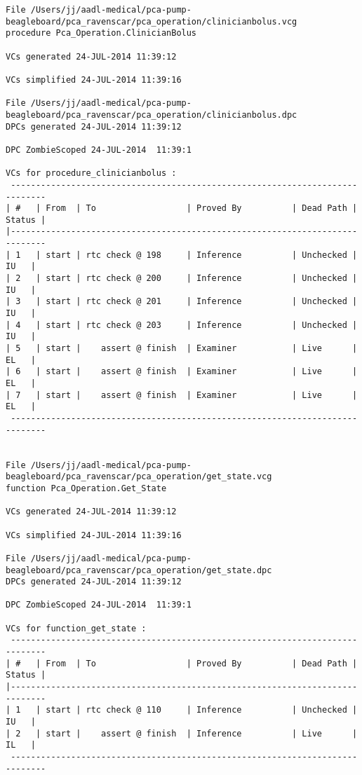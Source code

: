 \begin{lstlisting}[frame=single, gobble=0, caption={POGS report for PCA Pump prototype}]
File /Users/jj/aadl-medical/pca-pump-beagleboard/pca_ravenscar/pca_operation/clinicianbolus.vcg
procedure Pca_Operation.ClinicianBolus

VCs generated 24-JUL-2014 11:39:12

VCs simplified 24-JUL-2014 11:39:16

File /Users/jj/aadl-medical/pca-pump-beagleboard/pca_ravenscar/pca_operation/clinicianbolus.dpc
DPCs generated 24-JUL-2014 11:39:12

DPC ZombieScoped 24-JUL-2014  11:39:1

VCs for procedure_clinicianbolus :
 -----------------------------------------------------------------------------
| #   | From  | To                  | Proved By          | Dead Path | Status |
|-----------------------------------------------------------------------------
| 1   | start | rtc check @ 198     | Inference          | Unchecked |   IU   |
| 2   | start | rtc check @ 200     | Inference          | Unchecked |   IU   |
| 3   | start | rtc check @ 201     | Inference          | Unchecked |   IU   |
| 4   | start | rtc check @ 203     | Inference          | Unchecked |   IU   |
| 5   | start |    assert @ finish  | Examiner           | Live      |   EL   |
| 6   | start |    assert @ finish  | Examiner           | Live      |   EL   |
| 7   | start |    assert @ finish  | Examiner           | Live      |   EL   |
 -----------------------------------------------------------------------------


File /Users/jj/aadl-medical/pca-pump-beagleboard/pca_ravenscar/pca_operation/get_state.vcg
function Pca_Operation.Get_State

VCs generated 24-JUL-2014 11:39:12

VCs simplified 24-JUL-2014 11:39:16

File /Users/jj/aadl-medical/pca-pump-beagleboard/pca_ravenscar/pca_operation/get_state.dpc
DPCs generated 24-JUL-2014 11:39:12

DPC ZombieScoped 24-JUL-2014  11:39:1

VCs for function_get_state :
 -----------------------------------------------------------------------------
| #   | From  | To                  | Proved By          | Dead Path | Status |
|-----------------------------------------------------------------------------
| 1   | start | rtc check @ 110     | Inference          | Unchecked |   IU   |
| 2   | start |    assert @ finish  | Inference          | Live      |   IL   |
 -----------------------------------------------------------------------------



\end{lstlisting}
